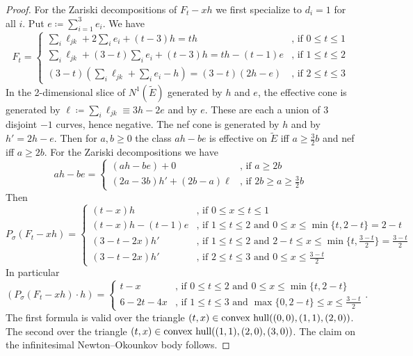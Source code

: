 \documentclass[12pt]{amsart}
\theoremstyle{definition}
\newcommand{\bb}{\ensuremath{\mathfrak{b}}}
\renewcommand{\geq}{\geqslant}
\renewcommand{\leq}{\leqslant}
\newcommand{\?}{ \circled{{\large\bf ?}}}
\let\bb\mathbb
\begin{document}
\begin{proof}
	
	For the Zariski decompositions of $F_t-xh$ we first specialize to $d_i=1$ for all $i$. Put $e\coloneqq\sum_{i=1}^3e_i$. We have \[F_t=\begin{cases}\sum_i\ell_{jk}+2\sum_ie_i+(t-3)h=th&\text{, if }0\leq t\leq 1\\
		\sum_i\ell_{jk}+(3-t)\sum_ie_i+(t-3)h=th-(t-1)e&\text{, if }1\leq t\leq 2\\
		(3-t)(\sum_i\ell_{jk}+\sum_ie_i-h)=(3-t)(2h-e)&\text{, if }2\leq t\leq 3
	\end{cases}\]
In the 2-dimensional slice of $N^1(\widetilde E)$ generated by $h$ and $e$, the effective cone is generated by $\ell\coloneqq \sum_i\ell_{jk}\equiv 3h-2e$ and by $e$. These are each a union of 3 disjoint $-1$ curves, hence negative. The nef cone is generated by $h$ and by $h'=2h-e$.
Then for $a,b\geq 0$ the class $ah-be$ is effective on $\widetilde E$ iff $a\geq\frac 32b$ and nef iff $a\geq 2b$. For the Zariski decompositions we have 
\[ah-be=\begin{cases}
	(ah-be)+0&\text{, if }a\geq 2b\\
	(2a-3b)h'+(2b-a)\ell&\text{, if } 2b\geq a\geq\frac 32b
\end{cases}\]
Then 
\[P_{\sigma}(F_t-xh)=\begin{cases}(t-x)h&\text{, if }0\leq x\leq t\leq 1\\ 
	(t-x)h-(t-1)e&\text{, if } 1\leq t\leq 2\text{ and }0\leq x\leq\min\{t,2-t\}=2-t\\
	(3-t-2x)h'&\text{, if }1\leq t\leq 2\text{ and } 2-t\leq x\leq\min\{t,\frac{3-t}2\}=\frac{3-t}2\\
	(3-t-2x)h'&\text{, if } 2\leq t\leq 3\text{ and }0\leq x\leq\frac{3-t}2
	\end{cases}
\]
In particular 
\[(P_{\sigma}(F_t-xh)\cdot h)=\begin{cases}
	t-x&\text{, if }0\leq t\leq 2\text{ and } 0\leq x\leq\min\{t,2-t\}\\ 
	6-2t-4x&\text{, if }1\leq t\leq 3\text{ and } \max\{0,2-t\}\leq x\leq \frac{3-t}2
\end{cases}.\] 
The first formula is valid over the triangle $(t,x)\in \textup{convex hull}((0,0),(1,1),(2,0))$. The second over the triangle $(t,x)\in \textup{convex hull}((1,1),(2,0),(3,0))$. 
The claim on the infinitesimal Newton--Okounkov body follows. 


\end{proof}
\end{document}

